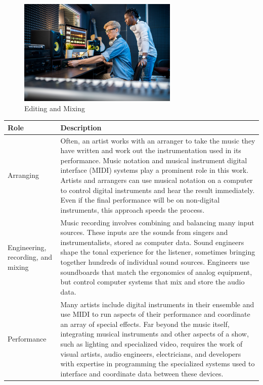 \begin{figure}[H]
	\begin{center}
		\caption{Editing and Mixing}
		\vskip 4pt
		\includegraphics[height=2in]{images/careers/iStock-1176082646.small.jpg}
	\end{center}
\end{figure}

\begin{table}[H]
	\begin{center}
		\begin{tabular}{p{1in}|p{3.4in}} 
			\textbf{Role} & \textbf{Description}\\
			\hline
			Arranging & Often, an artist works with an arranger to take the music they have written and work out the instrumentation used in its performance. Music notation and musical instrument digital interface (MIDI) systems play a prominent role in this work. Artists and arrangers can use musical notation on a computer to control digital instruments and hear the result immediately. Even if the final performance will be on non-digital instruments, this approach speeds the process.\\
			\hline
			Engineering, recording, and mixing & Music recording involves combining and balancing many input sources. These inputs are the sounds from singers and instrumentalists, stored as computer data. Sound engineers shape the tonal experience for the listener, sometimes bringing together hundreds of individual sound sources. Engineers use soundboards that match the ergonomics of analog equipment, but control computer systems that mix and store the audio data.\\
			\hline
			Performance & Many artists include digital instruments in their ensemble and use MIDI to run aspects of their performance and coordinate an array of special effects. Far beyond the music itself, integrating musical instruments and other aspects of a show, such as lighting and specialized video, requires the work of visual artists, audio engineers, electricians, and developers with expertise in programming the specialized systems used to interface and coordinate data between these devices.\\
			\hline
		\end{tabular}
	\end{center}
\end{table}

